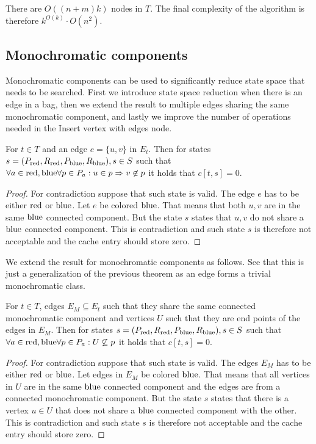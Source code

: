 There are \( O((n+m)k) \) nodes in \( T \).
The final complexity of the algorithm is therefore
\( {k}^{O(k)} \cdot O(n^2) \).

\subsection{Monochromatic components}

Monochromatic components can be used to significantly reduce state space
that needs to be searched. First we introduce state space reduction when
there is an edge in a bag, then we extend the result to multiple edges
sharing the same monochromatic component, and lastly we improve the number of
operations needed in the Insert vertex with edges node.
%
\begin{theorem}
	For \( t \in T \) and an edge \( e = \{u, v\} \) in \( E_t \).
	Then for states \( s = (P_{\text{red}}, R_{\text{red}}, P_{\text{blue}}, R_{\text{blue}}), s \in S \) such that
	\( \forall a \in {\text{red}, \text{blue}} \forall p \in P_a : u \in p \Rightarrow v \not\in p \)
	it holds that \( c[t, s] = 0 \).
\end{theorem}
%
%
\begin{proof}
	For contradiction suppose that such state is valid. The edge \( e \)
	has to be either \( \text{red} \) or \( \text{blue} \). Let \WLOG{} \( e \) be colored \( \text{blue} \).
	That means that both \( u, v \) are in the same \( \text{blue} \) connected component.
	But the state \( s \) states that \( u, v \) do not share a \( \text{blue} \) connected component.
	This is contradiction and such state \( s \) is therefore not acceptable
	and the cache entry should store zero.
\end{proof}
%

We extend the result for monochromatic components as follows.
See that this is just a generalization of the previous theorem
as an edge forms a trivial monochromatic class.
%
\begin{theorem}
	For \( t \in T \),
	edges \( E_M \subseteq E_t \) such that
	they share the same connected monochromatic component
	and vertices \( U \) such that they are end points of the edges in \( E_M \).
	Then for states \( s = (P_{\text{red}}, R_{\text{red}}, P_{\text{blue}}, R_{\text{blue}}), s \in S \) such that
	\( \forall a \in {\text{red}, \text{blue}} \forall p \in P_a : U \not\subseteq p \)
	it holds that \( c[t, s] = 0 \).
\end{theorem}
%
%
\begin{proof}
	For contradiction suppose that such state is valid. The edges \( E_M \)
	has to be either \( \text{red} \) or \( \text{blue} \).
	Let \WLOG{} edges in \( E_M \) be colored \( \text{blue} \).
	That means that all vertices in \( U \) are in the same \( \text{blue} \) connected component
	and the edges are from a connected monochromatic component.
	But the state \( s \) states that there is a vertex \( u \in U \)
	that does not share a \( \text{blue} \) connected component with the other.
	This is contradiction and such state \( s \) is therefore not acceptable
	and the cache entry should store zero.
\end{proof}
%

